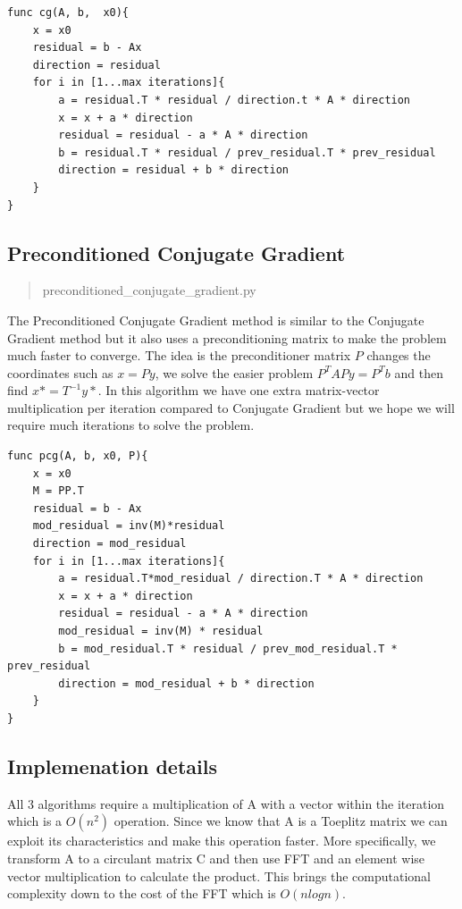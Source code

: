 \documentclass[a4paper]{article}
\begin{document}
\begin{lstlisting}
func cg(A, b,  x0){
	x = x0
	residual = b - Ax
	direction = residual
	for i in [1...max iterations]{
		a = residual.T * residual / direction.t * A * direction
		x = x + a * direction
		residual = residual - a * A * direction
		b = residual.T * residual / prev_residual.T * prev_residual
		direction = residual + b * direction
	}
}
\end{lstlisting}

\subsection{Preconditioned Conjugate Gradient}
\begin{quote}
	preconditioned\_conjugate\_gradient.py
\end{quote}
The Preconditioned Conjugate Gradient method is similar to the Conjugate Gradient method but it also uses a preconditioning matrix to make the problem much faster to converge. The idea is the preconditioner matrix $P$ changes the coordinates such as $x = Py$, we solve the easier problem  $P^TAPy=P^Tb$ and then find $x* = T^{-1}y*$. In this algorithm we have one extra matrix-vector multiplication per iteration compared to Conjugate Gradient but we hope we will require much iterations to solve the problem.

\begin{lstlisting}
func pcg(A, b, x0, P){
	x = x0
	M = PP.T
	residual = b - Ax
	mod_residual = inv(M)*residual
	direction = mod_residual
	for i in [1...max iterations]{
		a = residual.T*mod_residual / direction.T * A * direction
		x = x + a * direction
		residual = residual - a * A * direction
		mod_residual = inv(M) * residual
		b = mod_residual.T * residual / prev_mod_residual.T * prev_residual
		direction = mod_residual + b * direction
	}
}
\end{lstlisting}

\subsection{Implemenation details}
All 3 algorithms require a multiplication of A with a vector within the iteration which is a $O(n^2)$ operation. Since we know that A is a Toeplitz matrix we can exploit its characteristics and make this operation faster. More specifically, we transform A to a circulant matrix C and then use FFT and an element wise vector multiplication to calculate the product. This  brings the computational complexity down to the cost of the FFT which is $O(nlogn)$.
\end{document}
